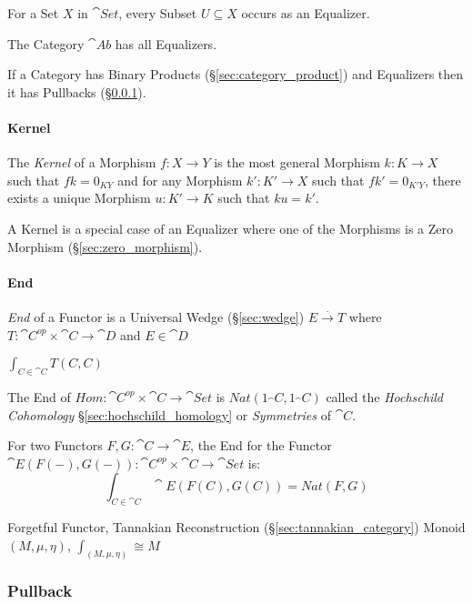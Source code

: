 For a Set $X$ in $\cat{Set}$, every Subset $U \subseteq X$ occurs
as an Equalizer.

The Category $\cat{Ab}$ has all Equalizers.

If a Category has Binary Products (\S\ref{sec:category_product}) and
Equalizers then it has Pullbacks (\S\ref{sec:pullback}).



\paragraph{Kernel}\label{sec:morphism_kernel}\hfill

The \emph{Kernel} of a Morphism $f : X \rightarrow Y$ is the most
general Morphism $k : K \rightarrow X$ such that $fk = 0_{KY}$ and for
any Morphism $k' : K' \rightarrow X$ such that $fk' = 0_{K'Y}$, there
exists a unique Morphism $u : K' \rightarrow K$ such that $ku = k'$.

A Kernel is a special case of an Equalizer where one of the Morphisms
is a Zero Morphism (\S\ref{sec:zero_morphism}).



\paragraph{End}\label{sec:end}\hfill

\emph{End} of a Functor is a Universal Wedge (\S\ref{sec:wedge}) $E
\xrightarrow{.} T$ where $T : \cat{C}^{op} \times \cat{C}
\rightarrow \cat{D}$ and $E \in \cat{D}$

$\int_{C \in \cat{C}} T(C,C)$

The End of $Hom : \cat{C}^{op} \times \cat{C} \rightarrow
\cat{Set}$ is $Nat (1_\cat{C},1_\cat{C})$ called the
\emph{Hochschild Cohomology} \S\ref{sec:hochschild_homology} or
\emph{Symmetries} of $\cat{C}$.

For two Functors $F,G : \cat{C} \rightarrow \cat{E}$, the End for
the Functor $\cat{E}(F(-), G(-)) : \cat{C}^{op} \times
\cat{C} \rightarrow \cat{Set}$ is:
\[
  \int_{C \in \cat{C}} \cat{E}(F(C), G(C)) = Nat (F,G)
\]

Forgetful Functor, Tannakian Reconstruction
(\S\ref{sec:tannakian_category}) %
Monoid $(M,\mu,\eta)$, $\int_{(M,\mu,\eta)} \cong M$



\subsubsection{Pullback}\label{sec:pullback}

